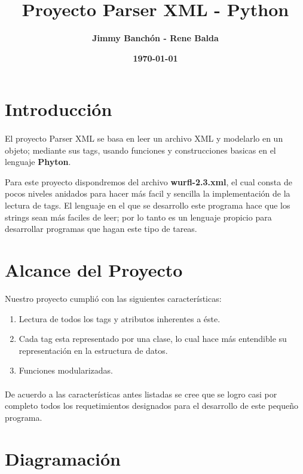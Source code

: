 \documentclass[11pt]{article}
\title{\textbf{Proyecto Parser XML - Python}}
\author{\textbf{Jimmy Banchón - Rene Balda}}
\date{\textbf{\today}}
\begin{document}


\maketitle
\section{\textbf{Introducción}} 
\paragraph{} \noindent
El proyecto Parser XML se basa en leer un archivo XML y modelarlo en un objeto; mediante sus tags, usando funciones y construcciones basicas en el lenguaje {\textbf{Phyton}}.

Para este proyecto dispondremos del archivo {\textbf{wurfl-2.3.xml}}, el cual consta de pocos niveles anidados para hacer más facil y sencilla la implementación de la lectura de tags. El lenguaje en el que se desarrollo este programa hace que los strings sean más faciles de leer; por lo tanto es un lenguaje propicio para desarrollar programas que hagan este tipo de tareas.
\section{\textbf{Alcance del Proyecto}}

Nuestro proyecto cumplió con las siguientes características:
\begin{enumerate}
\item 
Lectura de todos los tags y atributos inherentes a éste.

\item
Cada tag esta representado por una clase, lo cual hace más entendible su representación en la estructura de datos.

\item
Funciones modularizadas.

\end{enumerate}
\paragraph{} \noindent De acuerdo a las características antes listadas se cree que se logro casi por completo todos los requetimientos designados para el desarrollo de este pequeño programa.

\section{Diagramación}
\end{document}
